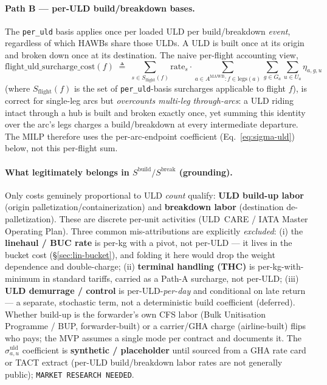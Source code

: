 \documentclass[11pt,a4paper]{article}
\newcommand{\defeq}{\triangleq}
\theoremstyle{definition}
\begin{document}
\paragraph{Path B --- per-ULD build/breakdown bases.}
The \texttt{per\_uld} basis applies once per loaded ULD per
build/breakdown \emph{event}, regardless of which HAWBs share those ULDs.
A ULD is built once at its origin and broken down once at its destination.
The naive per-flight accounting view,
\begin{equation}
  \text{flight\_uld\_surcharge\_cost}(f) \;\defeq\;
  \sum_{s \in S_{\text{flight}}(f)} \text{rate}_s
    \cdot \sum_{a \in A^{\text{MAWB}} : f \in \text{legs}(a)}
    \sum_{g \in G_a} \sum_{u \in U_a} \eta_{a,g,u}
  \label{eq:flight-uld-surcharge}
\end{equation}
(where $S_{\text{flight}}(f)$ is the set of \texttt{per\_uld}-basis surcharges
applicable to flight $f$), is correct for single-leg arcs but
\emph{overcounts multi-leg through-arcs}: a ULD riding intact through a hub
is built and broken exactly once, yet summing this identity over the arc's
legs charges a build/breakdown at every intermediate departure. The MILP
therefore uses the per-arc-endpoint coefficient (Eq.~\ref{eq:sigma-uld})
below, not this per-flight sum.

\paragraph{What legitimately belongs in $S^{\text{build}}/S^{\text{break}}$ (grounding).}
Only costs genuinely proportional to ULD \emph{count} qualify: \textbf{ULD
build-up labor} (origin palletization/containerization) and \textbf{breakdown
labor} (destination de-palletization). These are discrete per-unit activities
(ULD~CARE / IATA Master Operating Plan). Three common mis-attributions are
explicitly \emph{excluded}: (i) the \textbf{linehaul / BUC rate} is per-kg with
a pivot, not per-ULD --- it lives in the bucket cost (\S\ref{sec:lin-bucket}),
and folding it here would drop the weight dependence and double-charge; (ii)
\textbf{terminal handling (THC)} is per-kg-with-minimum in standard tariffs,
carried as a Path-A surcharge, not per-ULD; (iii) \textbf{ULD demurrage /
control} is per-ULD-\emph{per-day} and conditional on late return --- a
separate, stochastic term, not a deterministic build coefficient (deferred).
Whether build-up is the forwarder's own CFS labor (Bulk Unitisation
Programme / BUP, forwarder-built) or a carrier/GHA charge (airline-built)
flips who pays; the MVP assumes a single mode per contract and documents it.
The $\sigma^{\text{uld}}_{a,u}$ coefficient is \textbf{synthetic / placeholder}
until sourced from a GHA rate card or TACT extract (per-ULD build/breakdown
labor rates are not generally public); \texttt{MARKET RESEARCH NEEDED}.
\end{document}

